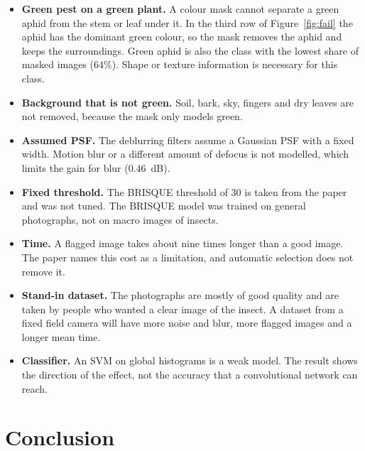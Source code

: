 \documentclass[12pt,a4paper]{article}
\let\oldsection\section
\renewcommand{\section}{\clearpage\oldsection}
\begin{document}
\begin{itemize}[nosep]
\item \textbf{Green pest on a green plant.} A colour mask cannot separate a green aphid from the stem or leaf under it. In the third row of Figure~\ref{fig:fail} the aphid has the dominant green colour, so the mask removes the aphid and keeps the surroundings. Green aphid is also the class with the lowest share of masked images (64\%). Shape or texture information is necessary for this class.
\item \textbf{Background that is not green.} Soil, bark, sky, fingers and dry leaves are not removed, because the mask only models green.
\item \textbf{Assumed PSF.} The deblurring filters assume a Gaussian PSF with a fixed width. Motion blur or a different amount of defocus is not modelled, which limits the gain for blur (0.46~dB).
\item \textbf{Fixed threshold.} The BRISQUE threshold of 30 is taken from the paper and was not tuned. The BRISQUE model was trained on general photographs, not on macro images of insects.
\item \textbf{Time.} A flagged image takes about nine times longer than a good image. The paper names this cost as a limitation, and automatic selection does not remove it.
\item \textbf{Stand-in dataset.} The photographs are mostly of good quality and are taken by people who wanted a clear image of the insect. A dataset from a fixed field camera will have more noise and blur, more flagged images and a longer mean time.
\item \textbf{Classifier.} An SVM on global histograms is a weak model. The result shows the direction of the effect, not the accuracy that a convolutional network can reach.
\end{itemize}

\section{Conclusion}
\end{document}
